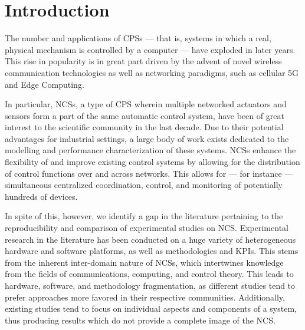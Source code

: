 \section{Introduction}\label{sec:intro}

The number and applications of \acp{CPS} --- that is, systems in which a real, physical mechanism is controlled by a computer --- have exploded in later years.
This rise in popularity is in great part driven by the advent of novel wireless communication technologies as well as networking paradigms, such as cellular 5G and Edge Computing.

In particular, \acp{NCS}, a type of \ac{CPS} wherein multiple networked actuators and sensors form a part of the same automatic control system, have been of great interest to the scientific community in the last decade.
Due to their potential advantages for industrial settings, a large body of work exists dedicated to the modelling and performance characterization of these systems.
\acp{NCS} enhance the flexibility of and improve existing control systems by allowing for the distribution of control functions over and across networks.
This allows for --- for instance --- simultaneous centralized coordination, control, and monitoring of potentially hundreds of devices.

In spite of this, however, we identify a gap in the literature pertaining to the reproducibility and comparison of experimental studies on \ac{NCS}.
Experimental research in the literature has been conducted on a huge variety of heterogeneous hardware and software platforms, as well as methodologies and \acp{KPI}.
This stems from the inherent inter-domain nature of \acp{NCS}, which intertwines knowledge from the fields of communications, computing, and control theory.
This leads to hardware, software, and methodology fragmentation, as different studies tend to prefer approaches more favored in their respective communities.
Additionally, existing studies tend to focus on individual aspects and components of a system, thus producing results which do not provide a complete image of the \ac{NCS}.


